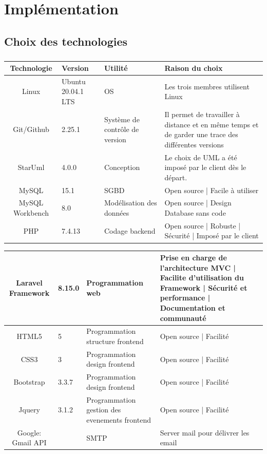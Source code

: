 \chapter{Implémentation}
        \section{Choix des technologies} 
        \paragraph{} 
\begin{tabular}{|c|p{1.5cm}|p{2.7cm}|p{4cm}|}
        \hline
        Technologie & Version & Utilité & Raison du choix \\
        \hline
        Linux & Ubuntu 20.04.1 LTS & OS & Les trois membres utilisent Linux \\
        \hline
        Git/Github & 2.25.1 & Système de contrôle de version & Il permet de travailler à distance et en même temps et de garder une trace des différentes versions\\
        \hline 
        StarUml & 4.0.0 & Conception & Le choix de UML a été imposé par le client dès le départ. \\
        \hline 
        MySQL & 15.1 & SGBD & Open source | Facile à utiliser\\
        \hline 
        MySQL Workbench & 8.0 & Modélisation des données & Open source | Design Database sans code\\
        \hline
        PHP & 7.4.13 & Codage backend & Open source | Robuste | Sécurité | Imposé par le client\\
        \hline
\end{tabular}
\begin{tabular}{|c|p{1.5cm}|p{2.7cm}|p{4cm}|}
        \hline
        Laravel Framework & 8.15.0 & Programmation web & Prise en charge de l’architecture MVC | Facilite d’utilisation du Framework | Sécurité et performance | Documentation et communauté\\
        \hline
        HTML5 & 5 & Programmation structure frontend & Open source | Facilité\\
        \hline
        CSS3 & 3 & Programmation design frontend & Open source | Facilité\\
        \hline
        Bootstrap & 3.3.7 & Programmation design frontend & Open source | Facilité\\
        \hline
        Jquery & 3.1.2 & Programmation gestion des evenements frontend & Open source | Facilité\\
        \hline
        Google: Gmail API &  & SMTP & Server mail pour délivrer les email\\
        \hline
\end{tabular}


